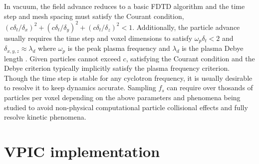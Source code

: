 \documentclass[10pt]{article}
\begin{document}
In vacuum, the field advance reduces to a basic FDTD algorithm
\cite{Yee_1966} and the time step and mesh spacing must satisfy the
Courant condition,
$\left(c\delta_t/\delta_x\right)^2 +
 \left(c\delta_t/\delta_y\right)^2 +
 \left(c\delta_t/\delta_z\right)^2 < 1$.
Additionally, the particle advance usually requires the time step and
voxel dimensions to satisfy $\omega_p \delta_t < 2$ and $\delta_{x,y,z}
\approx \lambda_d$ where $\omega_p$ is the peak plasma frequency and
$\lambda_d$ is the plasma Debye length
\cite{Birdsall_Langdon_1985,Hockney_Eastwood_1988}.
Given particles cannot exceed $c$, satisfying the Courant condition
and the Debye criterion typically implicitly satisfy the plasma
frequency criterion.  Though the time step is stable for any cyclotron
frequency, it is usually desirable to resolve it to keep dynamics
accurate.  Sampling $f_s$ can require over thosands of particles per
voxel depending on the above parameters and phenomena being studied to
avoid non-physical computational particle collisional effects and
fully resolve kinetic phenomena.

\section{VPIC implementation}
\end{document}
